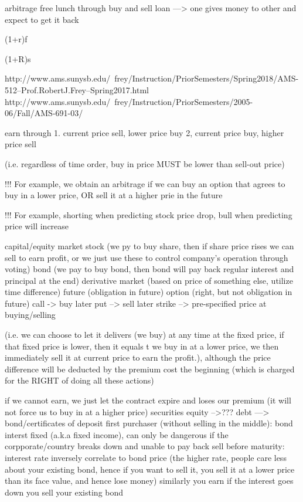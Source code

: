 arbitrage
	free lunch through buy and sell
loan ---> one gives money to other and expect to get it back


(1+r)f

(1+R)s

http://www.ams.sunysb.edu/~frey/Instruction/PriorSemesters/Spring2018/AMS-512--Prof.RobertJ.Frey--Spring2017.html
http://www.ams.sunysb.edu/~frey/Instruction/PriorSemesters/2005-06/Fall/AMS-691-03/


earn through
	1. current price sell, lower price buy
	2, current price buy, higher price sell
	
	(i.e. regardless of time order, buy in price MUST be lower than sell-out price)
	
	!!! For example, we obtain an arbitrage if we can buy an option that agrees to buy in a lower price, OR sell it at a higher prie in the future

	!!! For example, shorting when predicting stock price drop, bull when predicting price will increase


capital/equity market
	stock (we py to buy share, then if share price rises we can sell to earn profit, or we just use these to control company's operation through voting)
	bond (we pay to buy bond, then bond will pay back regular interest and principal at the end)
derivative market (based on price of something else, utilize time difference)
	future (obligation in future)
	option (right, but not obligation in future)
		call -> buy later
		put --> sell later
		strike --> pre-specified price at buying/selling
		
			(i.e. we can choose to let it delivers (we buy) at any time at the fixed price, if that fixed price is lower, then it equals t we buy in at a lower price, we then immediately sell it at current price to earn the profit.), although the price difference will be deducted by the premium cost the beginning (which is charged for the RIGHT of doing all these actions)
			
			if we cannot earn, we just let the contract expire and loses our premium (it will not force us to buy in at a higher price)
securities
	equity -->???
	debt ---> bond/certificates of deposit
	first purchaser (without selling in the middle): bond interst fixed (a.k.a fixed income), can only be dangerous if the corpporate/country breaks down and unable to pay back
	sell before maturity:
	interest rate inversely correlate to bond price (the higher rate, people care less about your existing bond, hence if you want to sell it, you sell it at a lower price than its face value, and hence lose money)
	similarly you earn if 
		the interest goes down
		you sell your existing bond
		
